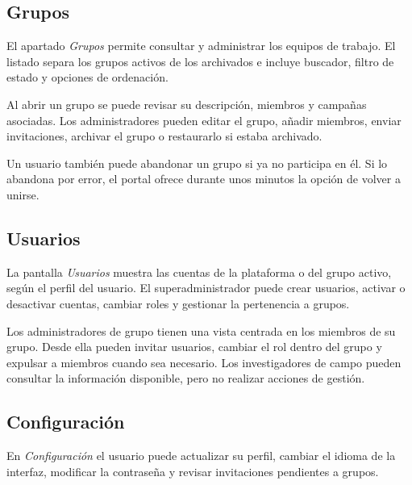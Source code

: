 \subsection{Grupos}

El apartado \textit{Grupos} permite consultar y administrar los equipos de trabajo.
El listado separa los grupos activos de los archivados e incluye buscador, filtro de
estado y opciones de ordenación.


Al abrir un grupo se puede revisar su descripción, miembros y campañas asociadas. Los
administradores pueden editar el grupo, añadir miembros, enviar invitaciones,
archivar el grupo o restaurarlo si estaba archivado.


Un usuario también puede abandonar un grupo si ya no participa en él. Si lo abandona
por error, el portal ofrece durante unos minutos la opción de volver a unirse.

\subsection{Usuarios}

La pantalla \textit{Usuarios} muestra las cuentas de la plataforma o del grupo activo,
según el perfil del usuario. El superadministrador puede crear usuarios, activar o
desactivar cuentas, cambiar roles y gestionar la pertenencia a grupos.


Los administradores de grupo tienen una vista centrada en los miembros de su grupo.
Desde ella pueden invitar usuarios, cambiar el rol dentro del grupo y expulsar a
miembros cuando sea necesario. Los investigadores de campo pueden consultar la
información disponible, pero no realizar acciones de gestión.

\subsection{Configuración}

En \textit{Configuración} el usuario puede actualizar su perfil, cambiar el idioma de
la interfaz, modificar la contraseña y revisar invitaciones pendientes a grupos.


